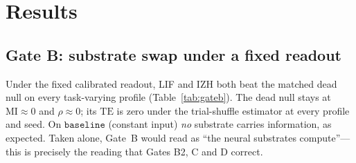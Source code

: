\documentclass[10pt,a4paper]{article}
\newcommand{\RMSE}{\ensuremath{\mathrm{RMSE}}}
\newcommand{\MI}{\ensuremath{\mathrm{MI}}}
\newcommand{\TE}{\ensuremath{\mathrm{TE}}}
\begin{document}
\section{Results}\label{sec:results}

\subsection{Gate B: substrate swap under a fixed readout}\label{sec:gateb}
\begin{table}[H]
\centering
\caption{Gate B: per-profile $\widehat{\RMSE}$, $\MI$ (nats), $\rho$
and $\TE$-significance under the fixed calibrated readout (5 profiles,
6 seeds). ``msd'' is the across-seed mean.}
\label{tab:gateb}

\end{table}
Under the fixed calibrated readout, LIF and IZH both beat the matched
dead null on every task-varying profile (Table~\ref{tab:gateb}).
The dead null stays at $\MI\approx0$ and $\rho\approx0$; its $\TE$ is
zero under the trial-shuffle estimator at every profile and seed. On
$\mathtt{baseline}$ (constant input) \emph{no} substrate carries
information, as expected. Taken alone, Gate~B would read as ``the
neural substrates compute''---this is precisely the reading that Gates
B2, C and D correct.
\end{document}
